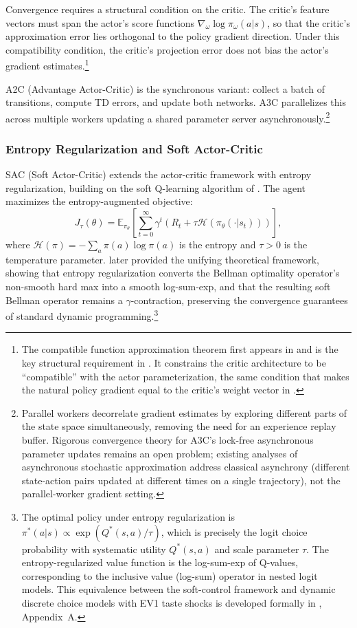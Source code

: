 Convergence requires a structural condition on the critic. The critic's feature vectors must span the actor's score functions $\nabla_\omega \log \pi_\omega(a|s)$, so that the critic's approximation error lies orthogonal to the policy gradient direction. Under this compatibility condition, the critic's projection error does not bias the actor's gradient estimates.\footnote{The compatible function approximation theorem first appears in \citet{SuttonMcAllester2000} and is the key structural requirement in \citet{konda2000}. It constrains the critic architecture to be ``compatible'' with the actor parameterization, the same condition that makes the natural policy gradient equal to the critic's weight vector in \citet{Kakade2002}.}

A2C (Advantage Actor-Critic) is the synchronous variant: collect a batch of transitions, compute TD errors, and update both networks. A3C \citep{mnih2016a3c} parallelizes this across multiple workers updating a shared parameter server asynchronously.\footnote{Parallel workers decorrelate gradient estimates by exploring different parts of the state space simultaneously, removing the need for an experience replay buffer. Rigorous convergence theory for A3C's lock-free asynchronous parameter updates remains an open problem; existing analyses of asynchronous stochastic approximation \citep{qu2020async} address classical asynchrony (different state-action pairs updated at different times on a single trajectory), not the parallel-worker gradient setting.}

\subsubsection{Entropy Regularization and Soft Actor-Critic}

SAC (Soft Actor-Critic) \citep{Haarnoja2018} extends the actor-critic framework with entropy regularization, building on the soft Q-learning algorithm of \citet{Haarnoja2017}. The agent maximizes the entropy-augmented objective:
\begin{equation}
J_\tau(\theta) = \mathbb{E}_{\pi_\theta}\left[\sum_{t=0}^\infty \gamma^t \left(R_t + \tau \mathcal{H}(\pi_\theta(\cdot|s_t))\right)\right],
\end{equation}
where $\mathcal{H}(\pi) = -\sum_a \pi(a) \log \pi(a)$ is the entropy and $\tau > 0$ is the temperature parameter. \citet{geist2019regularized} later provided the unifying theoretical framework, showing that entropy regularization converts the Bellman optimality operator's non-smooth hard max into a smooth log-sum-exp, and that the resulting soft Bellman operator remains a $\gamma$-contraction, preserving the convergence guarantees of standard dynamic programming.\footnote{The optimal policy under entropy regularization is $\pi^*(a|s) \propto \exp(Q^*(s,a)/\tau)$, which is precisely the \citet{McFadden1974} logit choice probability with systematic utility $Q^*(s,a)$ and scale parameter $\tau$. The entropy-regularized value function is the log-sum-exp of Q-values, corresponding to the inclusive value (log-sum) operator in nested logit models. This equivalence between the soft-control framework and dynamic discrete choice models with EV1 taste shocks is developed formally in \citet{RustRawat2026}, Appendix~A.}

